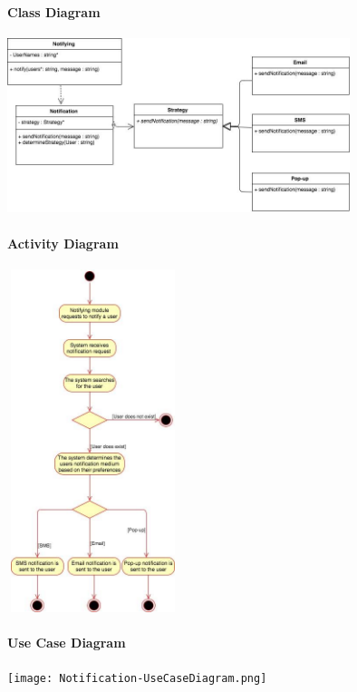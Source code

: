 \documentclass[runningheads,a4paper]{article}
\begin{document}
\paragraph{Class Diagram}
\begin{center}
\includegraphics[width=10cm]{ClassDiagram.png}\\
\end{center}
\paragraph{Activity Diagram}
\begin{center}
\includegraphics[height=10cm,width=5cm]{ActivityDiagram.png}\\ 
\end{center}
\paragraph{Use Case Diagram}
\begin{center}
\texttt{[image: Notification-UseCaseDiagram.png]}\\ 
\end{center}
\end{document}

